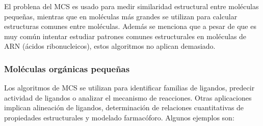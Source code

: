 El problena del MCS es usado para medir similaridad estructural entre moléculas pequeñas, mientras que en moléculas más grandes se utilizan para calcular estructuras comunes entre moléculas. Además se menciona que a pesar de que es muy común intentar estudiar patrones comunes estructurales en moléculas de ARN (ácidos ribonucleicos), estos algoritmos no aplican demasiado.

\subsubsection{Moléculas orgánicas pequeñas}

Los algoritmos de MCS se utilizan para identificar familias de ligandos, predecir actividad de ligandos o analizar el mecanismo de reacciones. Otras aplicaciones implican alineación de ligandos, determinación de relaciones cuantitativas de propiedades estructurales y modelado farmacóforo. Algunos ejemplos son:

